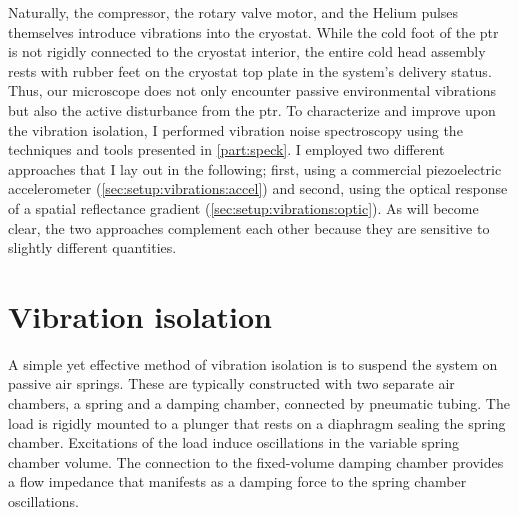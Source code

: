 Naturally, the compressor, the rotary valve motor, and the Helium pulses themselves introduce vibrations into the cryostat.
While the cold foot of the \gls{ptr} is not rigidly connected to the cryostat interior,
the entire cold head assembly rests with rubber feet on the cryostat top plate in the system's delivery status.
Thus, our microscope does not only encounter passive environmental vibrations but also the active disturbance from the \gls{ptr}.
To characterize and improve upon the vibration isolation, I performed vibration noise spectroscopy using the techniques and tools presented in \cref{part:speck}.
I employed two different approaches that I lay out in the following; first, using a commercial piezoelectric accelerometer (\cref{sec:setup:vibrations:accel}) and second, using the optical response of a spatial reflectance gradient (\cref{sec:setup:vibrations:optic}).
As will become clear, the two approaches complement each other because they are sensitive to slightly different quantities.

\section{Vibration isolation}\label{sec:setup:vibrations:isolation}
A simple yet effective method of vibration isolation is to suspend the system on passive air springs.
These are typically constructed with two separate air chambers, a spring and a damping chamber, connected by pneumatic tubing.
The load is rigidly mounted to a plunger that rests on a diaphragm sealing the spring chamber.
Excitations of the load induce oscillations in the variable spring chamber volume.
The connection to the fixed-volume damping chamber provides a flow impedance
that manifests as a damping force to the spring chamber oscillations.

